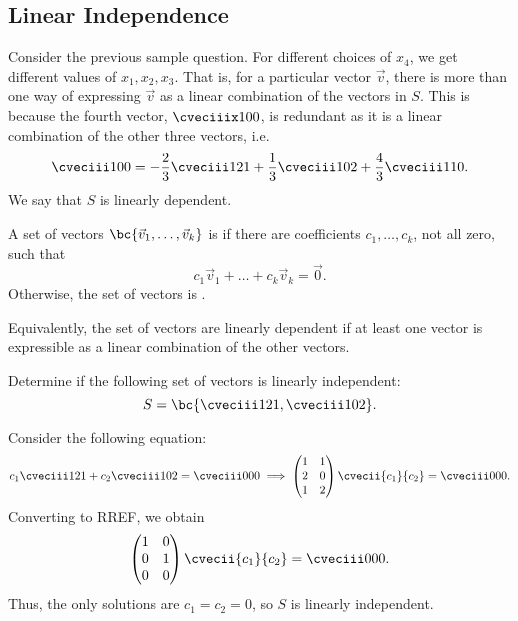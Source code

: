 \subsection{Linear Independence}

Consider the previous sample question. For different choices of $x_4$, we get different values of $x_1, x_2, x_3$. That is, for a particular vector $\vec v$, there is more than one way of expressing $\vec v$ as a linear combination of the vectors in $S$. This is because the fourth vector, $\cveciiix100$, is redundant as it is a linear combination of the other three vectors, i.e. \[\cveciii100 = -\frac23 \cveciii121 + \frac13 \cveciii102 + \frac43 \cveciii110.\] We say that $S$ is linearly dependent.

\begin{definition}
    A set of vectors $\bc{\vec v_1, \dots, \vec v_k}$ is  if there are coefficients $c_1, \dots, c_k$, not all zero, such that \[c_1 \vec v_1 + \dots + c_k \vec v_k = \vec 0.\] Otherwise, the set of vectors is .
\end{definition}

Equivalently, the set of vectors are linearly dependent if at least one vector is expressible as a linear combination of the other vectors.

\begin{sample}
    Determine if the following set of vectors is linearly independent: \[S = \bc{\cveciii121, \cveciii102}.\]
\end{sample}
\begin{sampans}
    Consider the following equation: \[c_1 \cveciii121 + c_2 \cveciii102 = \cveciii000 \implies \begin{pmatrix}1 & 1 \\ 2 & 0 \\ 1 & 2 \end{pmatrix} \cvecii{c_1}{c_2} = \cveciii000.\] Converting to RREF, we obtain \[\begin{pmatrix}1 & 0 \\ 0 & 1 \\ 0 & 0 \end{pmatrix} \cvecii{c_1}{c_2} = \cveciii000.\] Thus, the only solutions are $c_1 = c_2 = 0$, so $S$ is linearly independent.
\end{sampans}

